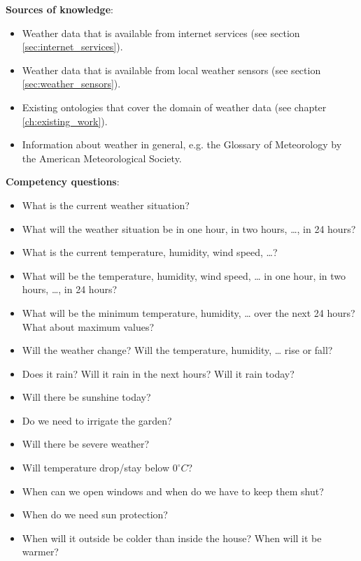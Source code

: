 \begin{mdframed}
\vspace{.2cm}

\textbf{Sources of knowledge}: %
\begin{itemize}
  \item Weather data that is available from internet services (see section \ref{sec:internet_services}).
  \item Weather data that is available from local weather sensors (see section \ref{sec:weather_sensors}).
  \item Existing ontologies that cover the domain of weather data (see chapter \ref{ch:existing_work}).
  \item Information about weather in general, e.g. the Glossary of Meteorology by the American Meteorological Society. %
\end{itemize}

\textbf{Competency questions}:
\begin{itemize}
  \item What is the current weather situation?
  \item What will the weather situation be in one hour, in two hours, …, in 24 hours?
  \item What is the current temperature, humidity, wind speed, …?
  \item What will be the temperature, humidity, wind speed, … in one hour, in two hours, …, in 24 hours?
  \item What will be the minimum temperature, humidity, … over the next 24 hours? What about maximum values?
  \item Will the weather change? Will the temperature, humidity, … rise or fall?
  \item Does it rain? Will it rain in the next hours? Will it rain today?
  \item Will there be sunshine today? 
  \item Do we need to irrigate the garden?
  \item Will there be severe weather?
  \item Will temperature drop/stay below $0^\circ C$?
  \item When can we open windows and when do we have to keep them shut?
  \item When do we need sun protection?
  \item When will it outside be colder than inside the house? When will it be warmer?
\end{itemize}

\end{mdframed}

